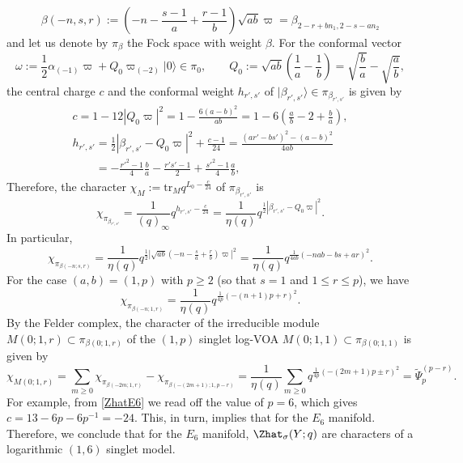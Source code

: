 \documentclass[pdftex]{sigma}
\begin{document}
\begin{Example}
\[
\beta(-n, s, r) := \left( -n - \frac{s-1}{a} + \frac{r-1}{b} \right) \sqrt{ab}\varpi = \beta_{2-r+bn_1, 2-s-an_2}
\]
and let us denote by $\pi_\beta$ the Fock space with weight $\beta$. For the conformal vector
\[
\omega := \frac{1}{2}\alpha_{(-1)} \varpi + Q_0 \varpi_{(-2)} |0\rangle \in \pi_0, \qquad Q_0 := \sqrt{ab}\left(\frac{1}{a} - \frac{1}{b}\right) = \sqrt{\frac{b}{a}} - \sqrt{\frac{a}{b}},
\]
the central charge $c$ and the conformal weight $h_{r',s'}$ of $|\beta_{r',s'}\rangle \in \pi_{\beta_{r',s'}}$ is given by
\begin{gather*}
c = 1 - 12|Q_0 \varpi|^2 = 1 - \frac{6(a-b)^2}{ab} = 1 - 6\left( \frac{a}{b} - 2 + \frac{b}{a} \right),
\\
h_{r',s'} = \frac{1}{2} |\beta_{r',s'} - Q_0 \varpi|^2 + \frac{c-1}{24} = \frac{(ar'-bs')^2-(a-b)^2}{4ab}
\\
\phantom{h_{r',s'} }{}
= - \frac{r'^2-1}{4}\frac{b}{a} - \frac{r's'-1}{2}+ \frac{s'^2-1}{4}\frac{a}{b},
\end{gather*}
Therefore, the character $\chi_M := \text{tr}_M q^{L_0 - \frac{c}{24}}$ of $\pi_{\beta_{r',s'}}$ is
\[
\chi_{\pi_{\beta_{r',s'}}} = \frac{1}{(q)_\infty} q^{h_{r',s'} - \frac{c}{24}} = \frac{1}{\eta(q)} q^{\frac{1}{2}|\beta_{r',s'} - Q_0 \varpi|^2}.
\]
In particular,
\[
\chi_{\pi_{\beta(-n;s,r)}} = \frac{1}{\eta(q)} q^{\frac{1}{2}|\sqrt{ab}(-n-\frac{s}{a}+\frac{r}{b})\varpi|^2} = \frac{1}{\eta(q)} q^{\frac{1}{4 a b}(-nab-bs+ar)^2}.
\]
For the case $(a,b) = (1,p)$ with $p \geq 2$ (so that $s = 1$ and $1 \leq r \leq p$), we have
\[
\chi_{\pi_{\beta(-n;1,r)}} = \frac{1}{\eta(q)} q^{\frac{1}{4p}(-(n+1)p+r)^2}.
\]
By the Felder complex, the character of the irreducible module $M(0; 1, r) \subset \pi_{\beta(0;1,r)}$ of the $(1, p)$ singlet log-VOA $M(0; 1, 1) \subset \pi_{\beta(0;1,1)}$ is given by
\[
\chi_{M(0;1,r)} = \sum_{m \geq 0} \chi_{\pi_{\beta(-2m;1,r)}} - \chi_{\pi_{\beta(-(2m+1);1,p-r)}} = \frac{1}{\eta(q)} \sum_{m \geq 0} q^{\frac{1}{4p}(-(2m+1)p \pm r)^2} = \tilde{\Psi}_p^{(p-r)}.
\]
For example, from \eqref{ZhatE6} we read off the value of $p = 6$, which gives $c = 13 - 6p - 6p^{-1} = -24$. This, in turn, implies that  for the $E_6$ manifold.
	Therefore, we conclude that for the $E_6$ manifold, $\Zhat_{\sigma} (Y; q)$ are characters of a logarithmic $(1, 6)$ singlet model.
\end{Example}
\end{document}
